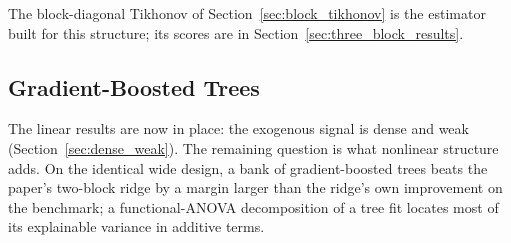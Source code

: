 The block-diagonal Tikhonov of Section~\ref{sec:block_tikhonov} is the
estimator built for this structure; its scores are in
Section~\ref{sec:three_block_results}.

\subsection{Gradient-Boosted Trees}
\label{sec:tree_edge}

The linear results are now in place: the exogenous signal is dense and
weak (Section~\ref{sec:dense_weak}). The remaining question is what
nonlinear structure adds.
On the identical wide design, a bank of gradient-boosted trees beats the
paper's two-block ridge by a margin larger than the ridge's own
improvement on the benchmark; a functional-ANOVA decomposition of a tree
fit locates most of its explainable variance in additive terms.

